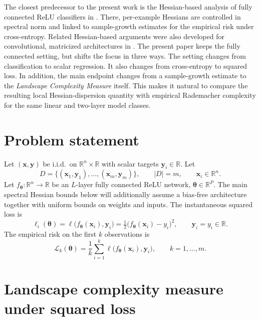 \documentclass[10pt,letterpaper]{article}
\theoremstyle{definition}
\begin{document}
The closest predecessor to the present work is the Hessian-based analysis of fully connected ReLU classifiers in \cite{kiselev2024hessian}. There, per-example Hessians are controlled in spectral norm and linked to sample-growth estimates for the empirical risk under cross-entropy. Related Hessian-based arguments were also developed for convolutional, matricized architectures in \cite{meshkov2024ispras}. The present paper keeps the fully connected setting, but shifts the focus in three ways. The setting changes from classification to scalar regression. It also changes from cross-entropy to squared loss. In addition, the main endpoint changes from a sample-growth estimate to the \emph{Landscape Complexity Measure} itself. This makes it natural to compare the resulting local Hessian-dispersion quantity with empirical Rademacher complexity for the same linear and two-layer model classes.

\section{Problem statement}\label{sec:problem}

Let $(\mathbf{x},\mathbf{y})$ be i.i.d.\ on $\mathbb{R}^{n}\times\mathbb{R}$ with scalar targets $\mathbf{y}_i\in\mathbb{R}$.
Let
\[
  D = \{(\mathbf{x}_1,\mathbf{y}_1),\ldots,(\mathbf{x}_m,\mathbf{y}_m)\},
  \qquad |D|=m,
  \qquad \mathbf{x}_i\in\mathbb{R}^n .
\]
Let $f_{\boldsymbol{\theta}}:\mathbb{R}^{n}\to\mathbb{R}$ be an $L$-layer fully connected ReLU network,
$\boldsymbol{\theta}\in\mathbb{R}^P$. The main spectral Hessian bounds below will additionally assume a bias-free architecture together with uniform bounds on weights and inputs. The instantaneous squared loss is
\begin{equation}\label{eq:loss-i}
  \ell_i(\boldsymbol{\theta})
  = \ell\bigl(f_{\boldsymbol{\theta}}(\mathbf{x}_i),\mathbf{y}_i\bigr)
  = \tfrac{1}{2}\bigl(f_{\boldsymbol{\theta}}(\mathbf{x}_i)-y_i\bigr)^2,
  \qquad \mathbf{y}_i = y_i\in\mathbb{R}.
\end{equation}
The empirical risk on the first $k$ observations is
\begin{equation}\label{eq:Lk}
  \mathcal{L}_k(\boldsymbol{\theta}) = \frac{1}{k}\sum_{i=1}^{k} \ell\bigl(f_{\boldsymbol{\theta}}(\mathbf{x}_i),\mathbf{y}_i\bigr),
  \qquad k=1,\ldots,m .
\end{equation}

\section{Landscape complexity measure under squared loss}\label{sec:landscape}
\end{document}
